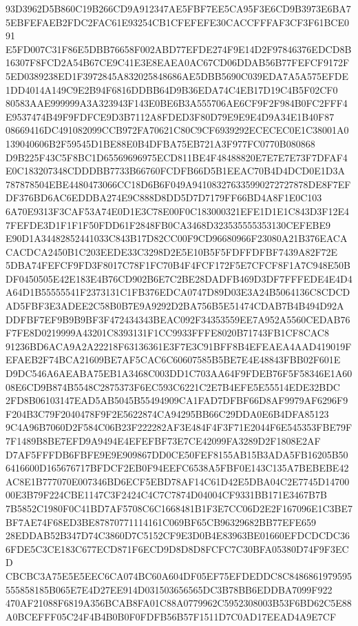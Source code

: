 \documentclass[UTF8,fontset=fandol,zihao=-4,a4paper]{ctexart}
\begin{document}
{{93D3962D5B860C19B266CD9A912347AE5FBF7EE5CA95F3E6CD9B3973E6BA75EBFEFAEB2FDC2FAC61E93254CB1CFEFEFE30CACCFFFAF3CF3F61BCE091
E5FD007C31F86E5DBB76658F002ABD77EFDE274F9E14D2F97846376EDCD8B16307F8FCD2A54B67CE9C41E3E8EAEA0AC67CD06DDAB56B77FEFCF9172F
5ED0389238ED1F3972845A832025848686AE5DBB5690C039EDA7A5A575EFDE1DD4014A149C9E2B94F6816DDBB64D9B36EDA74C4EB17D19C4B5F02CF0
80583AAE999999A3A323943F143E0BE6B3A555706AE6CF9F2F984B0FC2FFF4E9537474B49F9FDFCE9D3B7112A8FDED3F80D79E9E9E4D9A34E1B40F87
08669416DC491082099CCB972FA70621C80C9CF6939292ECECEC0E1C38001A0139040606B2F59545D1BE88E0B4DFBA75EB721A3F977FC0770B080868
D9B225F43C5F8BC1D65569696975ECD811BE4F48488820E7E7E7E73F7DFAF4E0C183207348CDDDBB7733B66760FCDFB66D5B1EEAC70B4D4DCD0E1D3A
787878504EBE4480473066CC18D6B6F049A941083276335990272727878DE8F7EFDF376BD6AC6EDDBA274E9C888D8DD5D7D7179FF66BD4A8F1E0C103
6A70E9313F3CAF53A74E0D1E3C78E00F0C183000321EFE1D1E1C843D3F12E47FEFDE3D1F1F1F50FDD61F2848FB0CA3468D323535555353130CEFEBE9
E90D1A34482852441033C843B17D82CC00F9CD96680966F23080A21B376EACACACDCA2450B1C203EEDE33C3298D2E5E10B5F5FDFFDFBF7439A82F72E
5DBA74FEFCF9FD3F8017C78F1FC70B4F4FCF172F5E7CFCF8F1A7C948E50BDF0450505E42E183E4B76CD902B6E7C2BE28DADFB469D3DF7FFFEDE4E4D4
A64D1B55555541F2373131C1FB376EDCA0747D89D03E3A24B5064136C8CDCDAD5FBF3E3ADEE2C58B0B7E9A9292D2BA756B5E51474CDAB7B4B494D92A
DDFBF7EF9B9B9BF3F472434343BEAC092F34353559EE7A952A5560CEDAB76F7FE8D0219999A43201C8393131F1CC9933FFFE8020B71743FB1CF8CAC8
91236BD6ACA9A2A22218F63136361E3F7E3C91BFF8B4EFEAEA4AAD419019FEFAEB2F74BCA21609BE7AF5CAC6C60607585B5BE7E4E48843FBB02F601E
D9DC546A6AEABA75EB1A3468C003DD1C703AA64F9FDEB76F5F58346E1A6008E6CD9B874B5548C2875373F6EC593C6221C2E7B4EFE5E55514EDE32BDC
2FD8B06103147EAD5AB5045B55494909CA1FAD7DFBF66D8AF9979AF6296F9F204B3C79F2040478F9F2E5622874CA94295BB66C29DDA0E6B4DFA85123
9C4A96B7060D2F584C06B23F222282AF3E484F4F3F71E2044F6E545353FBE79F7F1489B8BE7EFD9A9494E4EFEFBF73E7CE42099FA3289D2F1808E2AF
D7AF5FFFDB6FBFE9E9E909867DD0CE50FEF8155AB15B3ADA5FB16205B506416600D165676717BFDCF2EB0F94EEFC6538A5FBF0E143C135A7BEBEBE42
AC8E1B777070E007346BD6ECF5EBD78AF14C61D42E5DBA04C2E7745D1470000E3B79F224CBE1147C3F2424C4C7C7874D04004CF9331BB171E3467B7B
7B5852C1980F0C41BD7AF5708C6C1668481B1F3E7CC06D2E2F167096E1C3BE7BF7AE74F68ED3BE87870771114161C069BF65CB96329682BB77EFE659
28EDDAB52B347D74C3860D7C5152CF9E3D0B4E83963BE01660EFDCDCDC366FDE5C3CE183C677ECD871F6ECD9D8D8D8FCFC7C30BFA05380D74F9F3ECD
CBCBC3A75E5E5EEC6CA074BC60A604DF05EF75EFDEDDC8C8486861979595555858185B065E7E4D27EE914D031503656565DC3B78BB6EDDBA7099F922
470AF21088F6819A356BCAB8FA01C88A0779962C5952308003B53F6BD62C5E88A0BCEFFF05C24F4B4B0B0F0FDFB56B57F1511D7C0AD17EEAD4A9E7CF
}}
\end{document}
